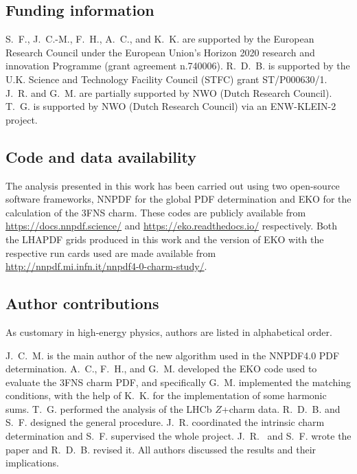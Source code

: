 \documentclass[11pt,a4paper]{article}
\begin{document}
\subsection*{Funding information}

S.~F., J.~C.-M., F.~H., A.~C., and K.~K. are supported by
the European Research Council under 
the European Union's Horizon 2020 research and innovation Programme
(grant agreement n.740006).
%
R.~D.~B. is supported by the U.K.
Science and Technology Facility Council (STFC) grant ST/P000630/1. 
%
J.~R. and G.~M. are partially supported by NWO (Dutch Research Council).
%
T.~G. is supported by NWO (Dutch Research Council) via an ENW-KLEIN-2 project.
%

\subsection*{Code and data availability}

The analysis presented in this work has been carried out using two
open-source software frameworks, {\sc\small NNPDF} for the global
PDF determination and {\sc\small EKO} for the calculation of the 3FNS charm.
%
These codes are publicly available from \url{https://docs.nnpdf.science/}
and \url{https://eko.readthedocs.io/} respectively.
%
Both the {\sc\small LHAPDF} grids produced in this work and the version
of {\sc\small EKO} with the respective run cards used are made available from
\url{http://nnpdf.mi.infn.it/nnpdf4-0-charm-study/}.

\subsection*{Author contributions}

As customary in high-energy physics, authors are listed
in alphabetical order.

J.~C.~M. is the main author of the new algorithm used in the NNPDF4.0
PDF determination.
A.~C., F.~H., and G.~M. developed the {\sc\small EKO} code used
to evaluate the 3FNS charm PDF, and specifically G.~M. implemented the
matching conditions, with the help of K.~K. for the implementation of
some harmonic sums.
T.~G. performed the analysis of the LHCb $Z$+charm data.
R.~D.~B. and S.~F. designed the general procedure. J.~R. coordinated
the intrinsic charm determination and S.~F. supervised the whole
project. J.~R.~ and S.~F. wrote the paper and R.~D.~B. revised it.
All authors discussed the results and their implications.

\clearpage
\end{document}
